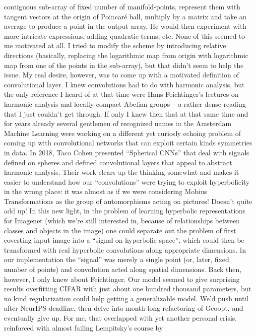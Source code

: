 contiguous sub-array of fixed number of manifold-points, represent them with
tangent vectors at the origin of Poincar\'e ball, multiply by a matrix and take
an average to produce a point in the output array. He would then experiment
with more intricate expressions, adding quadratic terms, etc. None of this seemed
to me motivated at all. I tried to modify the scheme by introducing relative
directions (basically, replacing the logarithmic map from origin with
logarithmic map from one of the points in the sub-array), but that didn't seem
to help the issue. My real desire, however, was to come up with a motivated
definition of convolutional layer. I knew convolutions had to do with harmonic analysis,
but the only reference I heard of at that time were Hans Feichtinger's lectures
on harmonic analysis and locally compact Abelian groups -- a rather dense
reading that I just couldn't get through. If only I knew then that at that same
time and for years already several gentlemen of recognized names in the
Amsterdam Machine Learning were working on a different yet curiosly echoing
problem of coming up with convolutional networks that can exploit certain kinds
symmetries in data. In 2018, Taco Cohen presented ``Spherical CNNs'' that deal
with signals defined on spheres and defined convolutional layers that appeal to
abstract harmonic analysis. Their work clears up the thinking somewhat and
makes it easier to understand how our ``convolutions'' were trying to exploit
hyperbolicity in the wrong place: it was almost as if we were considering
Mobius Transformations as the group of automorphisms acting on pictures!
Doesn't quite add up! In this new light, in the problem of learning hyperbolic
representations for Imagenet (which we're still interested in, because of
relationships between classes and objects in the image) one could separate out
the problem of first coverting input image into a ``signal on hyperbolic
space'', which could then be transformed with real hyperbolic convolutions
along appropriate dimensions. In our implementation the ``signal'' was merely a
single point (or, later, fixed number of points) and convolution acted along
spatial dimensions.
Back then, however, I only knew about Feichtinger. Our model seemed to give
surprising results overfitting CIFAR with just about one hundred thousand
parameters, but no kind regularization could help getting a generalizable
model. We'd push until after NeurIPS deadline, then delve into month-long
refactoring of Geoopt, and eventually give up. For me, that overlapped with yet
another personal crisis, reinforced with almost failing Lempitsky's course by
